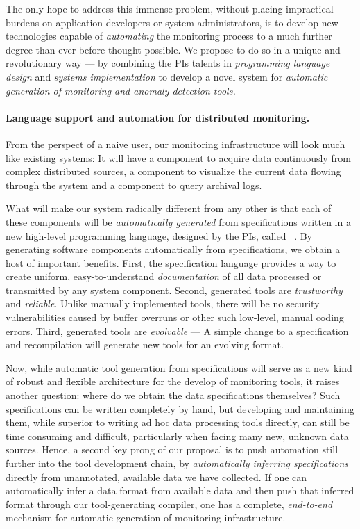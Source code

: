 The only hope to address this immense problem, without placing impractical
burdens on application developers or system administrators, is to develop
new technologies capable of {\em automating} the monitoring process
to a much further degree than ever before thought possible.  We propose to do
so in a unique and revolutionary way --- by combining the PIs talents
in {\em programming language design} and {\em systems implementation} to develop 
a novel system for {\em automatic generation of monitoring and anomaly 
detection tools.}

\paragraph*{Language support and automation for distributed monitoring.} 
From the perspect of a naive user,
our monitoring infrastructure will look much like
existing systems:  It will have 
a component to acquire data continuously 
from complex distributed sources, a component to visualize
the current data flowing through the system and a component 
to query archival logs.  

What will make our system radically different from any other is that each
of these components will be {\em automatically generated} from
specifications written in a new high-level programming language, 
designed by the PIs, called
\pads{}~\cite{fisher+:pads,fisher+:popl06,mandelbaum+:pads-ml}.  
By generating software components automatically from
specifications, we obtain a host of important benefits.  First, the
\pads{} specification language provides a way to create 
uniform, easy-to-understand {\em documentation} of all data processed
or transmitted by any system component.  Second, generated tools are
{\em trustworthy} and {\em reliable}. Unlike manually implemented
tools, there will be no security vulnerabilities caused by buffer
overruns or other such low-level, manual coding errors.  Third,
generated tools are {\em evolvable} --- A simple change to a
specification and recompilation will generate new tools for an
evolving format.

Now, while automatic tool generation from specifications will serve as 
a new kind of robust and flexible architecture for the develop of
monitoring tools, it raises another question: where do we obtain the
data specifications themselves?  Such specifications can be written completely
by hand, but developing and maintaining them,
while superior to writing ad hoc data processing tools directly, 
can still be time consuming and difficult, particularly when facing many
new, unknown data sources.  Hence, a second key prong of our proposal
is to push automation still further into the tool development chain,
by {\em automatically inferring specifications} directly from 
unannotated, available data we have collected.  If one can automatically
infer a data format from available data and then push that
inferred format through our tool-generating compiler, one has a
complete, {\em end-to-end} mechanism for automatic generation of
monitoring infrastructure. 

